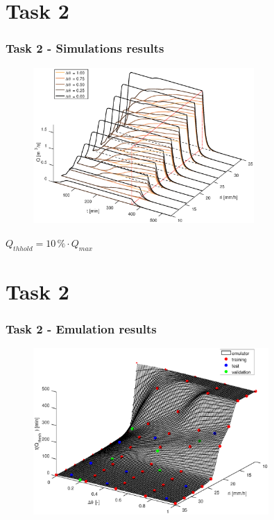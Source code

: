 \documentclass[xcolor=dvipsnames, USenglish]{beamer}  %
\begin{document}
\section{Task 2}
  \begin{frame}
    \frametitle{Task 2 - Simulations results}
    \begin{figure}[t]
      \centering
      \includegraphics[width=0.75\textwidth]{img/hydrographs3d.eps}
    \end{figure}
    {$Q_{thhold} = 10\,\% \cdot Q_{max}$}
  \end{frame}
  
\section{Task 2}
  \begin{frame}
    \frametitle{Task 2 - Emulation results}
    \begin{figure}[t]
      \centering
      \includegraphics[width=0.8\textwidth]{img/emulator.eps}
    \end{figure}
  \end{frame}
  
\end{document}

